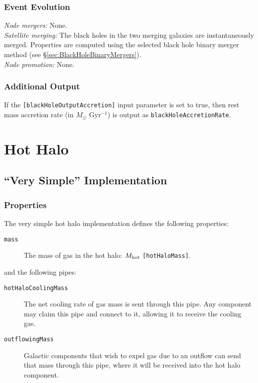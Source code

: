 \subsubsection{Event Evolution}

\noindent\emph{Node mergers:} None.\\

\noindent\emph{Satellite merging:} The black holes in the two merging galaxies are instantaneously merged. Properties are computed using the selected black hole binary merger method (see \S\ref{sec:BlackHoleBinaryMergers}).\\

\noindent\emph{Node promotion:} None.\\

\subsubsection{Additional Output}

If the {\tt [blackHoleOutputAccretion]} input parameter is set to true, then rest mass accretion rate (in $M_\odot$ Gyr$^{-1}$) is output as {\tt blackHoleAccretionRate}.

\section{Hot Halo}

\subsection{``Very Simple'' Implementation}

\subsubsection{Properties}

The very simple hot halo implementation defines the following properties:
\begin{description}
 \item [{\tt mass}] The mass of gas in the hot halo: $M_{\rm hot}$ {\tt [hotHaloMass]}.
\end{description}
and the following pipes:
\begin{description}
 \item [{\tt hotHaloCoolingMass}] The net cooling rate of gas mass is sent through this pipe. Any \gls{component} may claim this pipe and connect to it, allowing it to receive the cooling gas.
 \item [{\tt outflowingMass}] Galactic components that wish to expel gas due to an outflow can send that mass  through this pipe, where it will be received into the hot halo component. 
\end{description}

